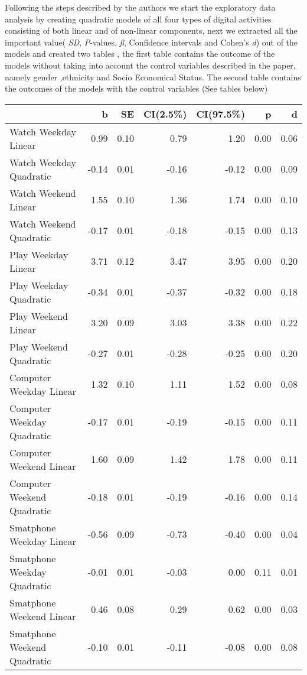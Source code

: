 \documentclass[man]{apa6}
\theoremstyle{definition}
\theoremstyle{definition}
\theoremstyle{definition}
\theoremstyle{remark}
\begin{document}
Following the steps described by the authors we start the exploratory
data analysis by creating quadratic models of all four types of digital
activities consisting of both linear and of non-linear components, next
we extracted all the important value( \emph{SD}, \emph{P}-values,
\emph{ß}, Confidence intervals and Cohen's \emph{d}) out of the models
and created two tables , the first table contains the outcome of the
models without taking into account the control variables described in
the paper, namely gender ,ethnicity and Socio Economical Status. The
second table contains the outcomes of the models with the control
variables (See tables below)

\begin{tabular}{l|r|r|r|r|r|r}
\hline
  & b & SE & CI(2.5\%) & CI(97.5\%) & p & d\\
\hline
Watch Weekday Linear & 0.99 & 0.10 & 0.79 & 1.20 & 0.00 & 0.06\\
\hline
Watch Weekday Quadratic & -0.14 & 0.01 & -0.16 & -0.12 & 0.00 & 0.09\\
\hline
Watch Weekend Linear & 1.55 & 0.10 & 1.36 & 1.74 & 0.00 & 0.10\\
\hline
Watch Weekend Quadratic & -0.17 & 0.01 & -0.18 & -0.15 & 0.00 & 0.13\\
\hline
Play Weekday Linear & 3.71 & 0.12 & 3.47 & 3.95 & 0.00 & 0.20\\
\hline
Play Weekday Quadratic & -0.34 & 0.01 & -0.37 & -0.32 & 0.00 & 0.18\\
\hline
Play Weekend Linear & 3.20 & 0.09 & 3.03 & 3.38 & 0.00 & 0.22\\
\hline
Play Weekend Quadratic & -0.27 & 0.01 & -0.28 & -0.25 & 0.00 & 0.20\\
\hline
Computer Weekday Linear & 1.32 & 0.10 & 1.11 & 1.52 & 0.00 & 0.08\\
\hline
Computer Weekday Quadratic & -0.17 & 0.01 & -0.19 & -0.15 & 0.00 & 0.11\\
\hline
Computer Weekend Linear & 1.60 & 0.09 & 1.42 & 1.78 & 0.00 & 0.11\\
\hline
Computer Weekend Quadratic & -0.18 & 0.01 & -0.19 & -0.16 & 0.00 & 0.14\\
\hline
Smatphone Weekday Linear & -0.56 & 0.09 & -0.73 & -0.40 & 0.00 & 0.04\\
\hline
Smatphone Weekday Quadratic & -0.01 & 0.01 & -0.03 & 0.00 & 0.11 & 0.01\\
\hline
Smatphone Weekend Linear & 0.46 & 0.08 & 0.29 & 0.62 & 0.00 & 0.03\\
\hline
Smatphone Weekend Quadratic & -0.10 & 0.01 & -0.11 & -0.08 & 0.00 & 0.08\\
\hline
\end{tabular}
\end{document}
